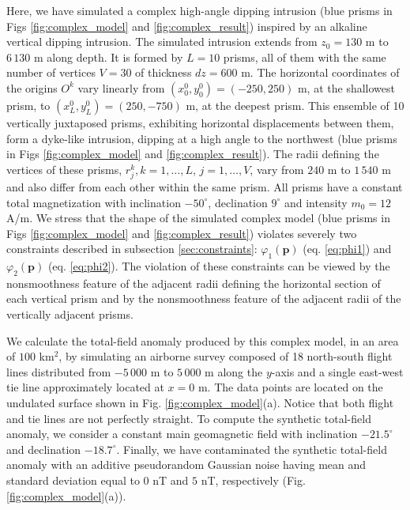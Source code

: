 Here, we have simulated a complex high-angle dipping intrusion (blue prisms in Figs \ref{fig:complex_model} and \ref{fig:complex_result}) inspired by an alkaline vertical dipping intrusion. 
The simulated intrusion extends from $z_0=130$ m to $6\,130$ m along depth.
It is formed by $ L = 10 $ prisms, all of them with the same number of vertices $ V = 30 $ of thickness $ dz = 600 $ m. 
The horizontal coordinates of the origins $ O^k $ vary linearly from $ (x_0^0, y_0^0) = (-250, 250) $ m, at the shallowest prism, to $ (x_L^0, y_L^0) = (250, -750) $ m, at the deepest prism. 
This ensemble of 10 vertically juxtaposed prisms, exhibiting horizontal displacements between them, form a dyke-like intrusion, dipping at a high angle to the northwest (blue prisms in Figs \ref{fig:complex_model} and \ref{fig:complex_result}). 
The radii defining the vertices of these prisms, $ r^k_j, k = 1, \dots, L$, $j = 1,\dots, V$, 
vary from $ 240 $ m to $ 1\,540 $ m and also differ from each other within the same prism. 
All prisms have a constant total magnetization with inclination $ -50^\circ $, declination $ 9^\circ $ and intensity $ m_0 = 12 $ A/m. 
We stress that the shape of the simulated complex model (blue prisms in Figs \ref{fig:complex_model} and \ref{fig:complex_result}) violates severely two constraints described in subsection \ref{sec:constraints}: $\varphi_{1}(\mathbf{p})$ (eq. \ref{eq:phi1})
and $\varphi_{2}(\mathbf{p})$ (eq. \ref{eq:phi2}).
The violation of these constraints can be viewed by the nonsmoothness feature of the adjacent radii defining the horizontal section of each vertical prism and by the nonsmoothness feature of the adjacent radii of the vertically adjacent prisms.

We calculate the total-field anomaly produced by this complex model, in an area of $ 100 $ km$^2 $, by simulating an airborne survey composed of 18 north-south flight lines distributed from $ -5\,000 $ m to $ 5\,000 $ m along the $ y $-axis and a single east-west tie line approximately located at $ x = 0 $ m. 
The data points are located on the undulated surface shown in Fig. \ref{fig:complex_model}(a). Notice that both flight and tie lines are not perfectly straight. 
To compute the synthetic total-field anomaly, we consider a constant main geomagnetic field with inclination $ -21.5^\circ $ and declination $ -18.7^\circ $. 
Finally, we have contaminated the synthetic total-field anomaly with an additive pseudorandom Gaussian noise having mean and standard deviation equal to $0$ nT and $5$ nT, respectively (Fig. \ref{fig:complex_model}(a)).

